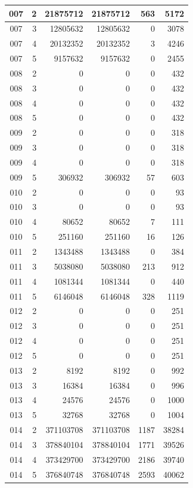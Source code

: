 \begin{longtable}{|c|r|r|r|r|r|}
\hline
007 & 2 & 21875712 & 21875712 & 563 & 5172 \\
\hline
007 & 3 & 12805632 & 12805632 & 0 & 3078 \\
\hline
007 & 4 & 20132352 & 20132352 & 3 & 4246 \\
\hline
007 & 5 & 9157632 & 9157632 & 0 & 2455 \\
\hline
008 & 2 & 0 & 0 & 0 & 432 \\
\hline
008 & 3 & 0 & 0 & 0 & 432 \\
\hline
008 & 4 & 0 & 0 & 0 & 432 \\
\hline
008 & 5 & 0 & 0 & 0 & 432 \\
\hline
009 & 2 & 0 & 0 & 0 & 318 \\
\hline
009 & 3 & 0 & 0 & 0 & 318 \\
\hline
009 & 4 & 0 & 0 & 0 & 318 \\
\hline
009 & 5 & 306932 & 306932 & 57 & 603 \\
\hline
010 & 2 & 0 & 0 & 0 & 93 \\
\hline
010 & 3 & 0 & 0 & 0 & 93 \\
\hline
010 & 4 & 80652 & 80652 & 7 & 111 \\
\hline
010 & 5 & 251160 & 251160 & 16 & 126 \\
\hline
011 & 2 & 1343488 & 1343488 & 0 & 384 \\
\hline
011 & 3 & 5038080 & 5038080 & 213 & 912 \\
\hline
011 & 4 & 1081344 & 1081344 & 0 & 440 \\
\hline
011 & 5 & 6146048 & 6146048 & 328 & 1119 \\
\hline
012 & 2 & 0 & 0 & 0 & 251 \\
\hline
012 & 3 & 0 & 0 & 0 & 251 \\
\hline
012 & 4 & 0 & 0 & 0 & 251 \\
\hline
012 & 5 & 0 & 0 & 0 & 251 \\
\hline
013 & 2 & 8192 & 8192 & 0 & 992 \\
\hline
013 & 3 & 16384 & 16384 & 0 & 996 \\
\hline
013 & 4 & 24576 & 24576 & 0 & 1000 \\
\hline
013 & 5 & 32768 & 32768 & 0 & 1004 \\
\hline
014 & 2 & 371103708 & 371103708 & 1187 & 38284 \\
\hline
014 & 3 & 378840104 & 378840104 & 1771 & 39526 \\
\hline
014 & 4 & 373429700 & 373429700 & 2186 & 39740 \\
\hline
014 & 5 & 376840748 & 376840748 & 2593 & 40062 \\

\end{longtable}
